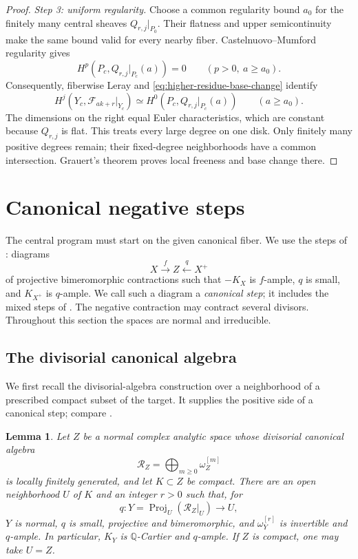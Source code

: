 \documentclass[11pt,a4paper]{article}
\numberwithin{equation}{section}
\newtheorem{lemma}[theorem]{Lemma}
\theoremstyle{definition}
\theoremstyle{remark}
\newcommand{\Q}{\mathbb Q}\newcommand{\R}{\mathbb R}
\begin{document}
\begin{proof}
\smallskip\noindent\emph{Step 3: uniform regularity.}
Choose a common regularity bound $a_0$ for the finitely many
central sheaves $Q_{r,j}|_{P_0}$. Their flatness and upper
semicontinuity make the same bound valid for every nearby fiber.
Castelnuovo--Mumford regularity \cite[Lecture~14]{Mumford1966}
gives
\[
 H^p(P_c,Q_{r,j}|_{P_c}(a))=0
 \qquad(p>0,\ a\ge a_0).
\]
Consequently, fiberwise Leray and
\eqref{eq:higher-residue-base-change} identify
\[
 H^j(Y_c,\mathcal F_{ak+r}|_{Y_c})
 \simeq H^0(P_c,Q_{r,j}|_{P_c}(a))
 \qquad(a\ge a_0).
\]
The dimensions on the right equal Euler characteristics, which
are constant because $Q_{r,j}$ is flat. This treats every large
degree on one disk. Only finitely many positive degrees remain;
their fixed-degree neighborhoods have a common intersection.
Grauert's theorem proves local freeness and base change there.
\end{proof}

\section{Canonical negative steps}
\label{sec:canonical-steps}

The central program must start on the given canonical fiber. We use
the steps of \cite[Definition~7]{Kollar2021}: diagrams
\[
 X\xrightarrow f Z\xleftarrow q X^+
\]
of projective bimeromorphic contractions such that $-K_X$ is
$f$-ample, $q$ is small, and $K_{X^+}$ is $q$-ample. We call such a
diagram a \emph{canonical step}; it includes the mixed steps of
\cite[Definition~7]{Kollar2021}. The negative contraction may
contract several divisors. Throughout this section the spaces are
normal and irreducible.

\subsection{The divisorial canonical algebra}

We first recall the divisorial-algebra construction
\cite[3.52 and Lemma~6.2]{KM1998} over a neighborhood of a prescribed
compact subset of the target. It supplies the positive side of a canonical step; compare
\cite[Definition~7]{Kollar2021}.

\begin{lemma}\label{lem:canonical-algebra}
Let $Z$ be a normal complex analytic space whose divisorial canonical
algebra
\[
 \mathcal R_Z=\bigoplus_{m\ge0}\omega_Z^{[m]}
\]
is locally finitely generated, and let $K\subset Z$ be compact.
There are an open neighborhood $U$ of $K$ and an integer $r>0$ such that,
for
\[
 q:Y=\operatorname{Proj}_U(\mathcal R_Z|_U)\longrightarrow U,
\]
$Y$ is normal, $q$ is small, projective and bimeromorphic, and
$\omega_Y^{[r]}$ is invertible and $q$-ample. In particular, $K_Y$
is $\Q$-Cartier and $q$-ample. If $Z$ is compact, one may take $U=Z$.
\end{lemma}
\end{document}
